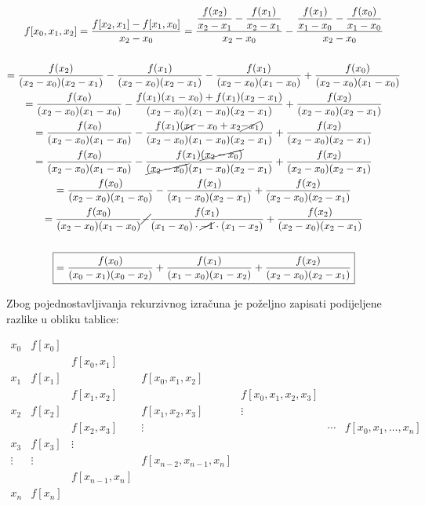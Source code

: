 \begin{gather*}
    f[x_0, x_1, x_2] = \frac{f[x_2,x_1]-f[x_1,x_0]}{x_2 - x_0} = \frac{\displaystyle\frac{f(x_2)}{x_2 - x_1}-\frac{f(x_1)}{x_2 - x_1}}{x_2 - x_0}-\frac{\displaystyle\frac{f(x_1)}{x_1 - x_0}-\frac{f(x_0)}{x_1 - x_0}}{x_2 - x_0}\\\\
    = \frac{f(x_2)}{(x_2-x_0)(x_2-x_1)}-\frac{f(x_1)}{(x_2-x_0)(x_2-x_1)}-\frac{f(x_1)}{(x_2-x_0)(x_1-x_0)}+\frac{f(x_0)}{(x_2-x_0)(x_1-x_0)}\\
    = \frac{f(x_0)}{(x_2-x_0)(x_1-x_0)}-\frac{f(x_1)(x_1-x_0)+f(x_1)(x_2-x_1)}{(x_2-x_0)(x_1-x_0)(x_2-x_1)}+\frac{f(x_2)}{(x_2-x_0)(x_2-x_1)}\\
    = \frac{f(x_0)}{(x_2-x_0)(x_1-x_0)}-\frac{f(x_1)(\cancel{x_1}-x_0+x_2\cancel{-x_1})}{(x_2-x_0)(x_1-x_0)(x_2-x_1)}+\frac{f(x_2)}{(x_2-x_0)(x_2-x_1)}\\
    = \frac{f(x_0)}{(x_2-x_0)(x_1-x_0)}-\frac{f(x_1)\cancel{(x_2-x_0)}}{\cancel{(x_2-x_0)}(x_1-x_0)(x_2-x_1)}+\frac{f(x_2)}{(x_2-x_0)(x_2-x_1)}\\
    = \frac{f(x_0)}{(x_2-x_0)(x_1-x_0)}-\frac{f(x_1)}{(x_1-x_0)(x_2-x_1)}+\frac{f(x_2)}{(x_2-x_0)(x_2-x_1)}\\
    = \frac{f(x_0)}{(x_2-x_0)(x_1-x_0)}\cancel{-}\frac{f(x_1)}{(x_1-x_0)\cdot\cancel{-1}\cdot(x_1-x_2)}+\frac{f(x_2)}{(x_2-x_0)(x_2-x_1)}\\\\
    \boxed{
    = \frac{f(x_0)}{(x_0-x_1)(x_0-x_2)}+\frac{f(x_1)}{(x_1-x_0)(x_1-x_2)}+\frac{f(x_2)}{(x_2-x_0)(x_2-x_1)}
    }
\end{gather*}

\newpage

Zbog pojednostavljivanja rekurzivnog izračuna je poželjno zapisati podijeljene razlike u obliku tablice:

\begin{tablebox}
    $$
    \begin{array}{ccccccc}
        x_0 & f[x_0] \\
        & & f[x_0, x_1] \\
        x_1 & f[x_1] & & f[x_0, x_1, x_2] \\
        & & f[x_1, x_2] & & f[x_0, x_1, x_2, x_3] \\
        x_2 & f[x_2] & & f[x_1, x_2, x_3] & \vdots \\
        & & f[x_2, x_3] & \vdots & & \cdots & f[x_0, x_1, \dots, x_n] \\
        x_3 & f[x_3] & \vdots \\
        \vdots & \vdots & & f[x_{n-2}, x_{n-1}, x_n] \\
        & & f[x_{n-1}, x_n] \\
        x_n & f[x_n] \\
    \end{array}
    $$
\end{tablebox}

